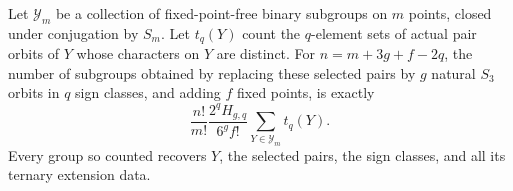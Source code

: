 \begin{proposition}
\label{prop:complete-marker-collapse}
Let $\mathcal Y_m$ be a collection of fixed-point-free binary
subgroups on $m$ points, closed under conjugation by $S_m$.
Let $t_q(Y)$ count the $q$-element sets of
actual pair orbits of $Y$ whose characters on $Y$ are distinct.
For $n=m+3g+f-2q$, the number of subgroups obtained by replacing these
selected pairs by $g$ natural $S_3$ orbits in $q$ sign classes, and
adding $f$ fixed points, is exactly
\begin{equation}\label{eq:complete-marker-collapse}
 \frac{n!}{m!}\frac{2^qH_{g,q}}{6^gf!}
                   \sum_{Y\in\mathcal Y_m}t_q(Y).
\end{equation}
Every group so counted recovers $Y$, the selected pairs, the sign
classes, and all its ternary extension data.
\end{proposition}
